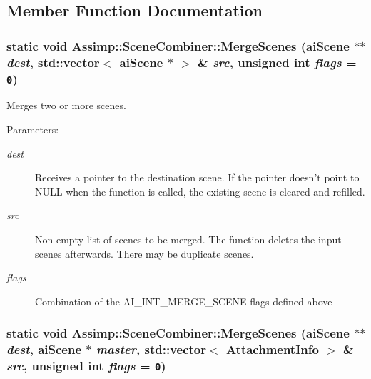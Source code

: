 \subsection{Member Function Documentation}
\hypertarget{class_assimp_1_1_scene_combiner_b399fdea5846bc969a021a39f5a11276}{
\subsubsection[MergeScenes]{\setlength{\rightskip}{0pt plus 5cm}static void Assimp::SceneCombiner::MergeScenes ({\bf aiScene} $\ast$$\ast$ {\em dest}, \/  std::vector$<$ {\bf aiScene} $\ast$ $>$ \& {\em src}, \/  unsigned int {\em flags} = {\tt 0})}}
\label{class_assimp_1_1_scene_combiner_b399fdea5846bc969a021a39f5a11276}


Merges two or more scenes.

\begin{Desc}
\item[Parameters:]
\begin{description}
\item[{\em dest}]Receives a pointer to the destination scene. If the pointer doesn't point to NULL when the function is called, the existing scene is cleared and refilled. \item[{\em src}]Non-empty list of scenes to be merged. The function deletes the input scenes afterwards. There may be duplicate scenes. \item[{\em flags}]Combination of the AI\_\-INT\_\-MERGE\_\-SCENE flags defined above \end{description}
\end{Desc}
\hypertarget{class_assimp_1_1_scene_combiner_49af3c46e42d4da59bb1a488e517618c}{
\subsubsection[MergeScenes]{\setlength{\rightskip}{0pt plus 5cm}static void Assimp::SceneCombiner::MergeScenes ({\bf aiScene} $\ast$$\ast$ {\em dest}, \/  {\bf aiScene} $\ast$ {\em master}, \/  std::vector$<$ {\bf AttachmentInfo} $>$ \& {\em src}, \/  unsigned int {\em flags} = {\tt 0})}}
\label{class_assimp_1_1_scene_combiner_49af3c46e42d4da59bb1a488e517618c}



